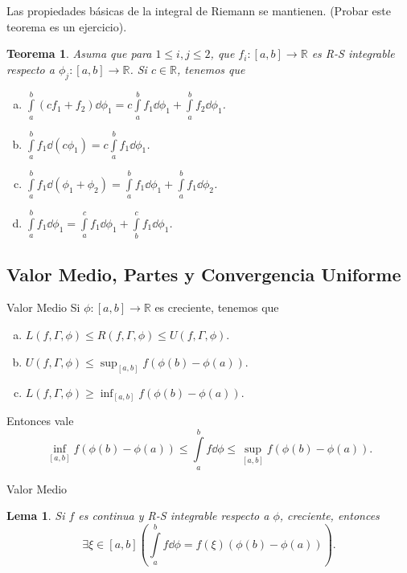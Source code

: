 \documentclass[utf8]{beamer}
\theoremstyle{plain}
\newtheorem{Th}{Teorema}               %
\newtheorem{Lem}{Lema}                 %
\theoremstyle{definition}
\theoremstyle{remark}
\numberwithin{equation}{section}
\newcommand{\Ga}{\Gamma}                %
\newcommand{\bR}{\mathbb{R}}    %
\renewcommand{\geq}{\geqslant}          %
\renewcommand{\leq}{\leqslant}          %
\renewcommand{\.}{\Cdot}                %
\begin{document}
\begin{frame}
  Las propiedades básicas de la integral de Riemann se mantienen. (Probar este teorema es un \alert{ejercicio}).
  \begin{Th}\label{thm:linealidadRS}
    Asuma que para $1\leq i,j\leq 2$, que $f_i:[a,b]\to\bR$ es R-S integrable respecto a $\phi_j:[a,b]\to\bR$. Si $c\in\bR$, tenemos que 
    \begin{enumerate}[(a)]
      \item $\int\limits_a^b(cf_1+f_2)\dd\phi_1=c\int\limits_a^bf_1\dd\phi_1+\int\limits_a^bf_2\dd\phi_1$.
      \item $\int\limits_a^bf_1\dd(c\phi_1)=c\int\limits_a^bf_1\dd\phi_1$.
      \item $\int\limits_a^bf_1\dd(\phi_1+\phi_2)=\int\limits_a^bf_1\dd\phi_1+\int\limits_a^bf_1\dd\phi_2$.
      \item $\int\limits_a^bf_1\dd\phi_1=\int\limits_a^cf_1\dd\phi_1+\int\limits_b^cf_1\dd\phi_1$.
    \end{enumerate}
  \end{Th}
  
\end{frame}

\subsection{Valor Medio, Partes y Convergencia Uniforme}
\begin{frame}{Valor Medio}
  Si $\phi:[a,b]\to\bR$ es creciente, tenemos que
  \begin{enumerate}[a)]
    \item $L(f,\Ga,\phi)\leq R(f,\Ga,\phi)\leq U(f,\Ga,\phi)$.
    \item $U(f,\Ga,\phi)\leq\sup_{[a,b]}f(\phi(b)-\phi(a))$.
    \item $L(f,\Ga,\phi)\geq\inf_{[a,b]}f(\phi(b)-\phi(a))$.
  \end{enumerate}
  Entonces vale 
  $$\inf_{[a,b]}f(\phi(b)-\phi(a))\leq\int\limits_a^bf\dd\phi\leq\sup_{[a,b]}f(\phi(b)-\phi(a)).$$
  
\end{frame}

\begin{frame}{Valor Medio}
  \begin{Lem}\label{lem:valorMedio}
    Si $f$ es continua y R-S integrable respecto a $\phi$, creciente, entonces
    $$\exists\xi\in[a,b]\left(\int\limits_a^bf\dd\phi=f(\xi)(\phi(b)-\phi(a))\right).$$
  \end{Lem}
\end{frame}
\end{document}
